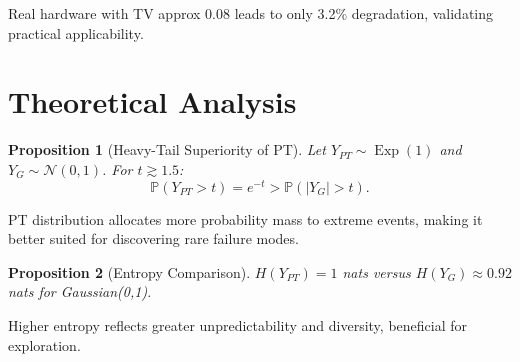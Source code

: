 \documentclass[twocolumn, a4paper, 11pt]{article}
\DeclareMathOperator{\Exp}{Exp}
\newtheorem{prop}{Proposition}
\begin{document}
Real hardware with TV approx 0.08 leads to only 3.2\% degradation, validating practical applicability.

\section{Theoretical Analysis}

\begin{prop}[Heavy-Tail Superiority of PT]
Let $Y_{PT}\sim\Exp(1)$ and $Y_G\sim\mathcal{N}(0,1)$. For $t\gtrsim1.5$:
$$\mathbb{P}(Y_{PT}>t)=e^{-t}>\mathbb{P}(|Y_G|>t).$$
\label{prop:heavy}
\end{prop}

PT distribution allocates more probability mass to extreme events, making it better suited for discovering rare failure modes.

\begin{prop}[Entropy Comparison]
$H(Y_{PT})=1$ nats versus $H(Y_G)\approx0.92$ nats for Gaussian(0,1).
\label{prop:entropy}
\end{prop}

Higher entropy reflects greater unpredictability and diversity, beneficial for exploration.
\end{document}
